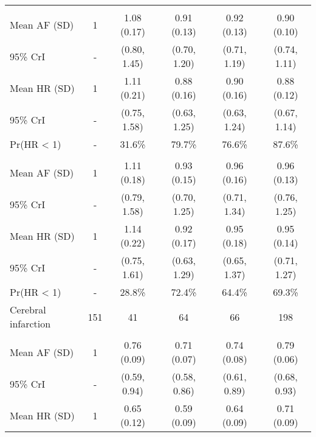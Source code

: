 \documentclass[nutrients,article,submitted,moreauthors,pdftex]{Definitions/mdpi}
\begin{document}
\begin{table}[H]
{\begin{tabular}[t]{lccccc}
\addlinespace[0.3em]
\multicolumn{6}{l}{\textbf{Model 1}}\\
\rowcolor{gray!6}  \hspace{1em}Mean AF (SD) & 1 & 1.08 (0.17) & 0.91 (0.13) & 0.92 (0.13) & 0.90 (0.10)\\
\hspace{1em}95\% CrI & - & (0.80, 1.45) & (0.70, 1.20) & (0.71, 1.19) & (0.74, 1.11)\\
\rowcolor{gray!6}  \hspace{1em}Mean HR (SD) & 1 & 1.11 (0.21) & 0.88 (0.16) & 0.90 (0.16) & 0.88 (0.12)\\
\hspace{1em}95\% CrI & - & (0.75, 1.58) & (0.63, 1.25) & (0.63, 1.24) & (0.67, 1.14)\\
\rowcolor{gray!6}  \hspace{1em}Pr(HR < 1) & - & 31.6\% & 79.7\% & 76.6\% & 87.6\%\\
\addlinespace[0.3em]
\multicolumn{6}{l}{\textbf{Model 2}}\\
\hspace{1em}Mean AF (SD) & 1 & 1.11 (0.18) & 0.93 (0.15) & 0.96 (0.16) & 0.96 (0.13)\\
\rowcolor{gray!6}  \hspace{1em}95\% CrI & - & (0.79, 1.58) & (0.70, 1.25) & (0.71, 1.34) & (0.76, 1.25)\\
\hspace{1em}Mean HR (SD) & 1 & 1.14 (0.22) & 0.92 (0.17) & 0.95 (0.18) & 0.95 (0.14)\\
\rowcolor{gray!6}  \hspace{1em}95\% CrI & - & (0.75, 1.61) & (0.63, 1.29) & (0.65, 1.37) & (0.71, 1.27)\\
\hspace{1em}Pr(HR < 1) & - & 28.8\% & 72.4\% & 64.4\% & 69.3\%\\
\hline
\rowcolor{gray!6}  Cerebral infarction & 151 & 41 & 64 & 66 & 198\\
\addlinespace[0.3em]
\multicolumn{6}{l}{\textbf{Model 0}}\\
\hspace{1em}Mean AF (SD) & 1 & 0.76 (0.09) & 0.71 (0.07) & 0.74 (0.08) & 0.79 (0.06)\\
\rowcolor{gray!6}  \hspace{1em}95\% CrI & - & (0.59, 0.94) & (0.58, 0.86) & (0.61, 0.89) & (0.68, 0.93)\\
\hspace{1em}Mean HR (SD) & 1 & 0.65 (0.12) & 0.59 (0.09) & 0.64 (0.09) & 0.71 (0.09)\\

\end{tabular}}
\end{table}
\end{document}
